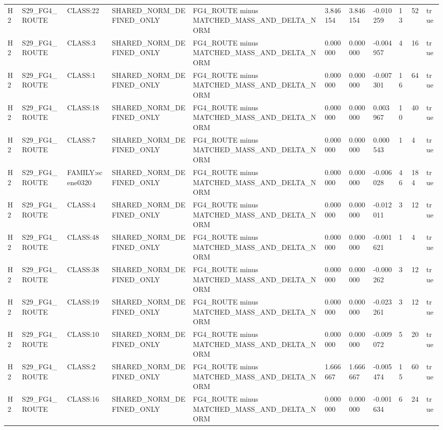 \begin{tabular}{lllllllllll}
H2 & S29\_FG4\_ROUTE & CLASS:22 & SHARED\_NORM\_DEFINED\_ONLY & FG4\_ROUTE minus MATCHED\_MASS\_AND\_DELTA\_NORM & 3.846154 & 3.846154 & -0.010259 & 13 & 52 & true \\
H2 & S29\_FG4\_ROUTE & CLASS:3 & SHARED\_NORM\_DEFINED\_ONLY & FG4\_ROUTE minus MATCHED\_MASS\_AND\_DELTA\_NORM & 0.000000 & 0.000000 & -0.004957 & 4 & 16 & true \\
H2 & S29\_FG4\_ROUTE & CLASS:1 & SHARED\_NORM\_DEFINED\_ONLY & FG4\_ROUTE minus MATCHED\_MASS\_AND\_DELTA\_NORM & 0.000000 & 0.000000 & -0.007301 & 16 & 64 & true \\
H2 & S29\_FG4\_ROUTE & CLASS:18 & SHARED\_NORM\_DEFINED\_ONLY & FG4\_ROUTE minus MATCHED\_MASS\_AND\_DELTA\_NORM & 0.000000 & 0.000000 & 0.003967 & 10 & 40 & true \\
H2 & S29\_FG4\_ROUTE & CLASS:7 & SHARED\_NORM\_DEFINED\_ONLY & FG4\_ROUTE minus MATCHED\_MASS\_AND\_DELTA\_NORM & 0.000000 & 0.000000 & 0.000543 & 1 & 4 & true \\
H2 & S29\_FG4\_ROUTE & FAMILY:scene0320 & SHARED\_NORM\_DEFINED\_ONLY & FG4\_ROUTE minus MATCHED\_MASS\_AND\_DELTA\_NORM & 0.000000 & 0.000000 & -0.006028 & 46 & 184 & true \\
H2 & S29\_FG4\_ROUTE & CLASS:4 & SHARED\_NORM\_DEFINED\_ONLY & FG4\_ROUTE minus MATCHED\_MASS\_AND\_DELTA\_NORM & 0.000000 & 0.000000 & -0.012011 & 3 & 12 & true \\
H2 & S29\_FG4\_ROUTE & CLASS:48 & SHARED\_NORM\_DEFINED\_ONLY & FG4\_ROUTE minus MATCHED\_MASS\_AND\_DELTA\_NORM & 0.000000 & 0.000000 & -0.001621 & 1 & 4 & true \\
H2 & S29\_FG4\_ROUTE & CLASS:38 & SHARED\_NORM\_DEFINED\_ONLY & FG4\_ROUTE minus MATCHED\_MASS\_AND\_DELTA\_NORM & 0.000000 & 0.000000 & -0.000262 & 3 & 12 & true \\
H2 & S29\_FG4\_ROUTE & CLASS:19 & SHARED\_NORM\_DEFINED\_ONLY & FG4\_ROUTE minus MATCHED\_MASS\_AND\_DELTA\_NORM & 0.000000 & 0.000000 & -0.023261 & 3 & 12 & true \\
H2 & S29\_FG4\_ROUTE & CLASS:10 & SHARED\_NORM\_DEFINED\_ONLY & FG4\_ROUTE minus MATCHED\_MASS\_AND\_DELTA\_NORM & 0.000000 & 0.000000 & -0.009072 & 5 & 20 & true \\
H2 & S29\_FG4\_ROUTE & CLASS:2 & SHARED\_NORM\_DEFINED\_ONLY & FG4\_ROUTE minus MATCHED\_MASS\_AND\_DELTA\_NORM & 1.666667 & 1.666667 & -0.005474 & 15 & 60 & true \\
H2 & S29\_FG4\_ROUTE & CLASS:16 & SHARED\_NORM\_DEFINED\_ONLY & FG4\_ROUTE minus MATCHED\_MASS\_AND\_DELTA\_NORM & 0.000000 & 0.000000 & -0.001634 & 6 & 24 & true \\

\end{tabular}
